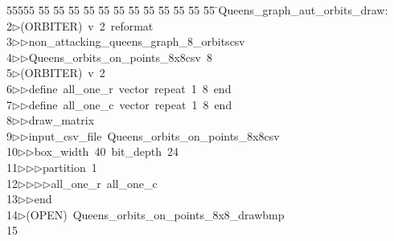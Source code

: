 %
%
\begin{tabbing}
55555 \= 55 \= 55 \= 55 \= 55 \= 55 \= 55 \= 55 \= 55 \= 55 \= 55 \= 55 \= 55 \= \>Queens\_graph\_aut\_orbits\_draw:\\[0pt]
2\>$\triangleright$\>(ORBITER)\ v\ 2\ reformat\ \\[0pt]
3\>$\triangleright$\>$\triangleright$\>non\_attacking\_queens\_graph\_8\_orbitscsv\ \\[0pt]
4\>$\triangleright$\>$\triangleright$\>Queens\_orbits\_on\_points\_8x8csv\ 8\ \\[0pt]
5\>$\triangleright$\>(ORBITER)\ v\ 2\ \\[0pt]
6\>$\triangleright$\>$\triangleright$\>define\ all\_one\_r\ vector\ repeat\ 1\ 8\ end\ \\[0pt]
7\>$\triangleright$\>$\triangleright$\>define\ all\_one\_c\ vector\ repeat\ 1\ 8\ end\ \\[0pt]
8\>$\triangleright$\>$\triangleright$\>draw\_matrix\ \\[0pt]
9\>$\triangleright$\>$\triangleright$\>input\_csv\_file\ Queens\_orbits\_on\_points\_8x8csv\ \\[0pt]
10\>$\triangleright$\>$\triangleright$\>box\_width\ 40\ bit\_depth\ 24\ \\[0pt]
11\>$\triangleright$\>$\triangleright$\>$\triangleright$\>partition\ 1\ \\[0pt]
12\>$\triangleright$\>$\triangleright$\>$\triangleright$\>$\triangleright$\>all\_one\_r\ all\_one\_c\ \\[0pt]
13\>$\triangleright$\>$\triangleright$\>end\\[0pt]
14\>$\triangleright$\>(OPEN)\ Queens\_orbits\_on\_points\_8x8\_drawbmp\\[0pt]
15\>\end{tabbing}
